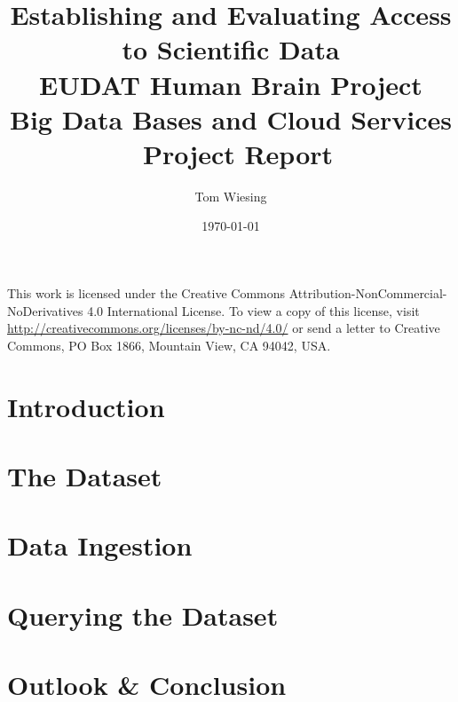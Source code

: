 \documentclass{article}
\title{Establishing and Evaluating Access to Scientific Data \\EUDAT Human Brain Project \\ Big Data Bases and Cloud Services \\ Project Report}
\author{Tom Wiesing}
\date{\today}
\begin{document}
	\maketitle


	\newpage

	\tableofcontents


	\vspace{\fill}\noindent
	This work is licensed under the Creative Commons Attribution-NonCommercial-NoDerivatives 4.0 International License. To view a copy of this license, visit \url{http://creativecommons.org/licenses/by-nc-nd/4.0/} or send a letter to Creative Commons, PO Box 1866, Mountain View, CA 94042, USA.
	\newpage

	\section{Introduction}
	
	\newpage

	\section{The Dataset}
	
	\newpage

	\section{Data Ingestion}
	
	\newpage

	\section{Querying the Dataset}
	
	\newpage

	\section{Outlook \& Conclusion}
	
	\newpage

	\printbibliography
\end{document}
